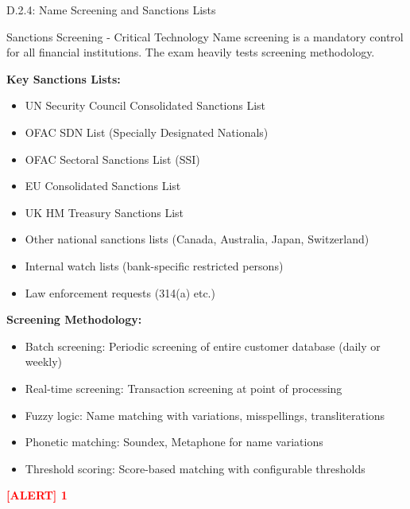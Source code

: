 \documentclass[11pt,a4paper]{beamer}
\newcommand{\redflag}[1]{\textcolor{red}{\textbf{[ALERT] 1}}}
\begin{document}
\begin{frame}{D.2.4: Name Screening and Sanctions Lists}
	\begin{block}{Sanctions Screening - Critical Technology}
		Name screening is a mandatory control for all financial institutions. The exam heavily tests screening methodology.
	\end{block}
	\textbf{Key Sanctions Lists:}
	\begin{itemize}
		\item UN Security Council Consolidated Sanctions List
		\item OFAC SDN List (Specially Designated Nationals)
		\item OFAC Sectoral Sanctions List (SSI)
		\item EU Consolidated Sanctions List
		\item UK HM Treasury Sanctions List
		\item Other national sanctions lists (Canada, Australia, Japan, Switzerland)
		\item Internal watch lists (bank-specific restricted persons)
		\item Law enforcement requests (314(a) etc.)
	\end{itemize}
	\textbf{Screening Methodology:}
	\begin{itemize}
		\item Batch screening: Periodic screening of entire customer database (daily or weekly)
		\item Real-time screening: Transaction screening at point of processing
		\item Fuzzy logic: Name matching with variations, misspellings, transliterations
		\item Phonetic matching: Soundex, Metaphone for name variations
		\item Threshold scoring: Score-based matching with configurable thresholds
	\end{itemize}
	\redflag{Exact-string matching is INSUFFICIENT for sanctions screening. Fuzzy logic is required.}
\end{frame}
\end{document}
